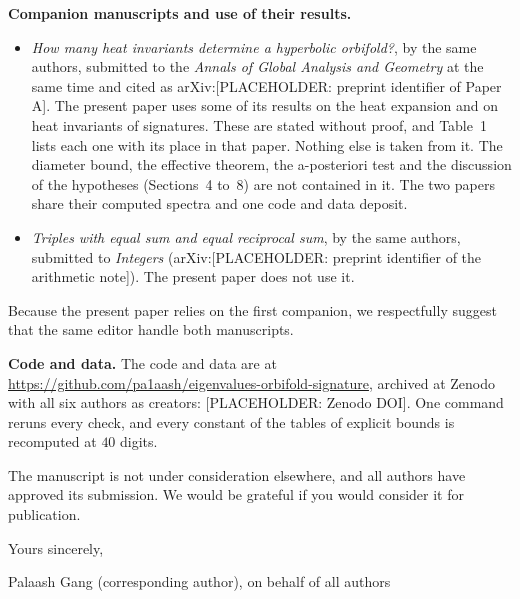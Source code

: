 \documentclass[11pt]{article}
\begin{document}
\textbf{Companion manuscripts and use of their results.}
\begin{itemize}\setlength{\itemsep}{2pt}
\item \emph{How many heat invariants determine a hyperbolic orbifold?}, by the same authors, submitted to the \emph{Annals of Global Analysis and Geometry} at the same time and cited as arXiv:[PLACEHOLDER: preprint identifier of Paper A]. The present paper uses some of its results on the heat expansion and on heat invariants of signatures. These are stated without proof, and Table~1 lists each one with its place in that paper. Nothing else is taken from it. The diameter bound, the effective theorem, the a-posteriori test and the discussion of the hypotheses (Sections~4 to~8) are not contained in it. The two papers share their computed spectra and one code and data deposit.
\item \emph{Triples with equal sum and equal reciprocal sum}, by the same authors, submitted to \emph{Integers} (arXiv:[PLACEHOLDER: preprint identifier of the arithmetic note]). The present paper does not use it.
\end{itemize}
Because the present paper relies on the first companion, we respectfully suggest that the same editor handle both manuscripts.

\textbf{Code and data.} The code and data are at \url{https://github.com/pa1aash/eigenvalues-orbifold-signature}, archived at Zenodo with all six authors as creators: [PLACEHOLDER: Zenodo DOI]. One command reruns every check, and every constant of the tables of explicit bounds is recomputed at $40$ digits.

The manuscript is not under consideration elsewhere, and all authors have approved its submission. We would be grateful if you would consider it for publication.

Yours sincerely,

\vspace{10mm}
Palaash Gang (corresponding author), on behalf of all authors
\end{document}
